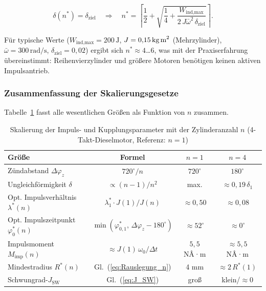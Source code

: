 ﻿\documentclass[a4paper,12pt]{article}
\begin{document}
\begin{equation}
  \delta(n^*) = \delta_\text{ziel}
  \quad\Longrightarrow\quad
  n^* = \left\lceil \frac{1}{2} +
    \sqrt{\frac{1}{4} + \frac{W_\text{ind,max}}{2\,J\bar{\omega}^2\,\delta_\text{ziel}}}
  \right\rceil.
  \label{eq:n_stern}
\end{equation}

Für typische Werte ($W_\text{ind,max} = 200\,\text{J}$,
$J = 0{,}15\,\text{kg\,m}^2$ (Mehrzylinder), $\bar\omega = 300\,\text{rad/s}$,
$\delta_\text{ziel} = 0{,}02$) ergibt sich $n^* \approx 4$\ldots$6$, was mit
der Praxiserfahrung übereinstimmt: Reihenvierzylinder und größere Motoren
benötigen keinen aktiven Impulsantrieb.

\subsubsection*{Zusammenfassung der Skalierungsgesetze}

Tabelle~\ref{tab:skalierung_n} fasst alle wesentlichen Größen als Funktion
von $n$ zusammen.

\begin{table}[h]
\centering
\caption{Skalierung der Impuls- und Kupplungsparameter mit der Zylinderanzahl $n$
(4-Takt-Dieselmotor, Referenz: $n=1$)}
\label{tab:skalierung_n}
\begin{tabular}{lccc}
\toprule
\textbf{Größe} & \textbf{Formel} & $n=1$ & $n=4$ \\
\midrule
Zündabstand $\Delta\varphi_z$ & $720^\circ/n$ & $720^\circ$ & $180^\circ$ \\
Ungleichförmigkeit $\delta$ & $\propto (n-1)/n^2$ & max. & $\approx 0{,}19\,\delta_1$ \\
Opt. Impulsverhältnis $\lambda^*(n)$ & $\lambda^*_1 \cdot J(1)/J(n)$ & $\approx 0{,}50$ & $\approx 0{,}08$ \\
Opt. Impulszeitpunkt $\varphi_0^*(n)$ & $\min(\varphi_{0,1}^*,\, \Delta\varphi_z - 180^\circ)$ & $\approx 52^\circ$ & $\approx 0^\circ$ \\
Impulsmoment $M_\text{imp}(n)$ & $\approx J(1)\,\omega_0/\Delta t$ & $5{,}5$ NÂ·m & $\approx 5{,}5$ NÂ·m \\
Mindestradius $R^*(n)$ & Gl.~(\ref{eq:Rauslegung_n}) & 4 mm & $\approx 2\,R^*(1)$ \\
Schwungrad-$J_\text{SW}$ & Gl.~(\ref{eq:J_SW}) & groß & klein/$\approx 0$ \\
\bottomrule
\end{tabular}
\end{table}
\end{document}

